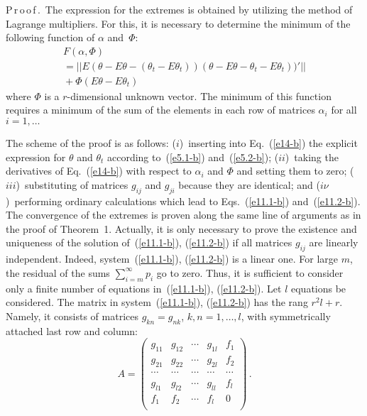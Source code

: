 \begin{multicols}{2}
\medskip

\noindent 
P\,r\,o\,o\,f\,.\ 
The expression for the extremes is obtained by utilizing the method of Lagrange multipliers.  
For this, it is necessary to determine the minimum of the following function of $\alpha $ 
and~$\Phi$:
\begin{multline}
F(\alpha ,\Phi )\\
{}= || E(\theta -E\theta -(\theta_{t} -E\theta_{t} ))
(\theta -E\theta -\theta_{t} -E\theta_{t} ))' ||\\
{} + \Phi (E\theta -E\theta_{t} )
\label{e14-b}
\end{multline}
where $\Phi$ is a $r$-dimensional unknown vector.  The minimum of this 
function requires a minimum of the sum of the elements in each row of matrices 
$\alpha_{i} $ for all $i=1,\dots$

The scheme of the proof is as follows: ($i$)~inserting into Eq.~(\ref{e14-b}) the 
explicit expression 
for $\theta $ and $\theta_{t} $ according to~(\ref{e5.1-b}) and~(\ref{e5.2-b}); 
($ii$)~taking the derivatives of Eq.~(\ref{e14-b}) 
with respect to $\alpha_{i}$ and \textit{$\Phi$} and setting them to zero;
($iii$)~substituting of 
matrices $g_{ij} $ and $g_{ji} $ because they are identical; and ($i\nu$)~performing ordinary 
calculations which lead to Eqs.~(\ref{e11.1-b}) and~(\ref{e11.2-b}). The convergence of the extremes is proven along 
the same line of arguments as in the proof of Theorem~1. Actually, it is only necessary 
to prove the existence and uniqueness of the solution of~(\ref{e11.1-b}), (\ref{e11.2-b})
if all matrices $g_{ij} $ 
are linearly independent. Indeed, system~(\ref{e11.1-b}), (\ref{e11.2-b}) 
is a linear one. For large $m$, 
the residual of the sums $\sum\limits_{i=m}^{\infty }p_{i}  $ go to zero. Thus, 
it is sufficient to consider only a finite number of equations in~(\ref{e11.1-b}), (\ref{e11.2-b}). 
Let  $l$ 
equations be considered. The matrix in system~(\ref{e11.1-b}), (\ref{e11.2-b})
 has  the rang $r^{2} l+r$. 
Namely, it consists of matrices $g_{kn} =g_{nk}$, $k,n=1,\ldots , l$, 
with symmetrically attached last row and column:
$$
A=\begin{pmatrix}
    g_{11} & g_{12} & \cdots & g_{1l} & f_{1} \\
    g_{21}& g_{22} & \cdots & g_{2l} & f_{2} \\
    \cdots & \cdots & \cdots & \cdots & \cdots \\
    g_{l1} & g_{l2} & \cdots & g_{ll} & f_{l} \\
    f_{1} & f_{2} & \cdots  & f_{l} & 0 \\
\end{pmatrix}\,.
$$


\end{multicols}
